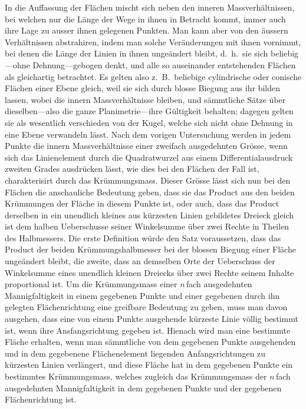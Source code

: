\documentclass[a4paper,12pt]{article}
\begin{document}
In die Auffassung der Fl\"{a}chen mischt sich neben den inneren
Massverh\"{a}ltnissen, bei welchen nur die L\"{a}nge der Wege in
ihnen in Betracht kommt, immer auch ihre Lage zu ausser ihnen
gelegenen Punkten.  Man kann aber von den \"{a}ussern
Verh\"{a}ltnissen abstrahiren, indem man solche Ver\"{a}nderungen
mit ihnen vornimmt, bei denen die L\"{a}nge der Linien in ihnen
unge\"{a}ndert bleibt, d.~h.\ sie sich beliebig---ohne
Dehnung---gebogen denkt, und alle so auseinander entstehenden
Fl\"{a}chen als gleichartig betrachtet.  Es gelten also
z.~B.\ beliebige cylindrische oder conische Fl\"{a}chen einer
Ebene gleich, weil sie sich durch blosse Biegung aus ihr bilden
lassen, wobei die innern Massverh\"{a}ltnisse bleiben, und
s\"{a}mmtliche S\"{a}tze \"{u}ber dieselben---also die ganze
Planimetrie---ihre G\"{u}ltigkeit behalten; dagegen gelten sie
als wesentlich verschieden von der Kugel, welche sich nicht ohne
Dehnung in eine Ebene verwandeln l\"{a}sst.  Nach dem vorigen
Untersuchung werden in jedem Punkte die innern
Massverh\"{a}ltnisse einer zweifach ausgedehnten Gr\"{o}sse, wenn
sich das Linienelement durch die Quadratwurzel aus einem
Differentialausdruck zweiten Grades ausdr\"{u}cken l\"{a}sst, wie
dies bei den Fl\"{a}chen der Fall ist, charakterisirt durch das
Kr\"{u}mmungsmass.  Dieser Gr\"{o}sse l\"{a}sst sich nun bei den
Fl\"{a}chen die anschauliche Bedeutung geben, dass sie das
Product aus den beiden Kr\"{u}mmungen der Fl\"{a}che in diesem
Punkte ist, oder auch, dass das Product derselben in ein
unendlich kleines aus k\"{u}rzesten Linien gebildetes Dreieck
gleich ist dem halben Ueberschusse seiner Winkelsumme \"{u}ber
zwei Rechte in Theilen des Halbmessers.  Die erste Definition
w\"{u}rde den Satz voraussetzen, dass das Product der beiden
Kr\"{u}mmungshalbmesser bei der blossen Biegung einer Fl\"{a}che
unge\"{a}ndert bleibt, die zweite, dass an demselben Orte der
Ueberschuss der Winkelsumme eines unendlich kleinen Dreiecks
\"{u}ber zwei Rechte seinem Inhalte proportional ist.  Um die
Kr\"{u}mmungsmass einer $n \,$\-fach ausgedehnten Mannigfaltigkeit in
einem gegebenen Punkte und einer gegebenen durch ihn gelegten
Fl\"{a}chenrichtung eine greifbare Bedeutung zu geben, muss man
davon ausgehen, dass eine von einem Punkte ausgehende
k\"{u}rzeste Linie v\"{o}llig bestimmt ist, wenn ihre
Ansfangsrichtung gegeben ist.  Hienach wird man eine bestimmte
Fl\"{a}che erhalten, wenn man s\"{a}mmtliche von dem gegebenen
Punkte ausgehenden und in dem gegebenene Fl\"{a}chenelement
liegenden Anfangsrichtungen zu k\"{u}rzesten Linien
verl\"{a}ngert, und diese Fl\"{a}che hat in dem gegebenen Punkte
ein bestimmtes Kr\"{u}mmungsmass, welches zugleich das
Kr\"{u}mmungsmass der $n \,$\-fach ausgedehnten Mannigfaltigkeit in
dem gegebenen Punkte und der gegebenen Fl\"{a}chenrichtung ist.
\end{document}
